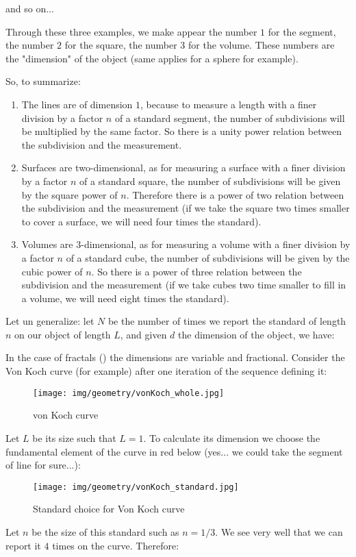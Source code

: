 	and so on...
	
	Through these three examples, we make appear the number $1$ for the segment,  the number $2$ for the square, the number $3$ for the volume. These numbers are the "dimension" of the object (same applies for a sphere for example).
	
	So, to summarize:
	\begin{enumerate}
		\item The lines are of dimension $1$, because to measure a length with a finer division by a factor $n$ of a standard segment, the number of subdivisions will be multiplied by the same factor. So there is a unity power relation between the subdivision and the measurement.
		\item Surfaces are two-dimensional, as for measuring a surface with a finer division by a factor $n$ of a standard square, the number of subdivisions will be given by the square power of $n$. Therefore there is a power of two relation between the subdivision and the measurement (if we take the square two times smaller to cover a surface, we will need four times the standard).
		\item Volumes are 3-dimensional, as for measuring a volume with a finer division by a factor $n$ of a standard cube, the number of subdivisions will be given by the cubic power of $n$. So there is a power of three relation between the subdivision and the measurement (if we take cubes two time smaller to fill in a volume, we will need eight times the standard).
	\end{enumerate}
	Let un generalize: let $N$ be the number of times we report the standard of length $n$ on our object of length $L$, and given $d$ the dimension of the object, we have:
	
	In the case of fractals () the dimensions are variable and fractional. Consider the Von Koch curve (for example) after one iteration of the sequence defining it:
	\begin{figure}[H]
		\centering
		\texttt{[image: img/geometry/vonKoch\_whole.jpg]}
		\caption{von Koch curve}
	\end{figure}
	Let $L$ be its size such that $L=1$. To calculate its dimension we choose the fundamental element of the curve in red below (yes... we could take the segment of line for sure...):
	\begin{figure}[H]
		\centering
		\texttt{[image: img/geometry/vonKoch\_standard.jpg]}
		\caption{Standard choice for Von Koch curve}
	\end{figure}
	Let $n$ be the size of this standard such as $n=1/3$. We see very well that we can report it $4$ times on the curve. Therefore:
	
